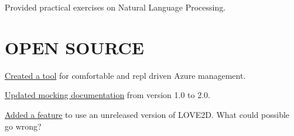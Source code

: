\documentclass[]{deedy-resume-openfont}
\begin{document}
\begin{minipage}[t]{0.66\textwidth}
Provided practical exercises on Natural Language Processing.
\sectionsep




\section{OPEN SOURCE}
\href{https://git.sr.ht/~jiglesias/azufre}{Created a tool} 
for comfortable and repl driven Azure management.
\sectionsep

\href{https://github.com/zio/zio/pull/7600}{Updated mocking documentation} 
from version 1.0 to 2.0.
\sectionsep

\href{https://gitlab.com/alexjgriffith/min-love2d-fennel/-/issues/10}{Added a feature} 
to use an unreleased version of LOVE2D. What could possible go wrong?
\sectionsep

\end{minipage} 
\end{document}
